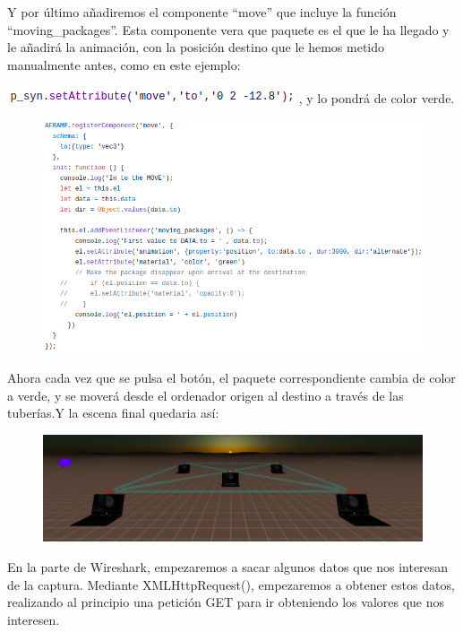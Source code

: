 \documentclass[a4paper, 12pt]{book}
\begin{document}
Y por último añadiremos el componente “move” que incluye la función “moving\_packages”. Esta componente vera que paquete es el que le ha llegado y le añadirá la animación, con la posición destino que le hemos metido manualmente antes, como en este ejemplo:

    \includegraphics[scale=0.65]{img/paso2_c.png}
, y lo pondrá de color verde.


\begin{figure}[h]
\centering
    \includegraphics[scale=0.65]{img/move.png}
\end{figure}

Ahora cada vez que se pulsa el botón, el paquete correspondiente cambia de color a verde, y se moverá desde el ordenador origen al destino a través de las tuberías.Y la escena final quedaria así:
\begin{figure}[h]
\centering
    \includegraphics[scale=0.5]{img/escena2_final.png}
\end{figure}

\newpage
En la parte de Wireshark, empezaremos a sacar algunos datos que nos interesan de la captura.
Mediante XMLHttpRequest(), empezaremos a obtener estos datos, realizando al principio una petición GET para ir obteniendo los valores que nos interesen.
\end{document}
